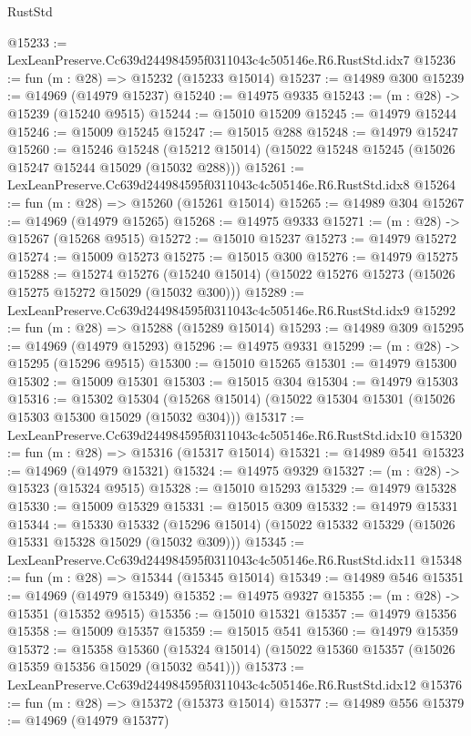 \begin{lexlean}{RustStd}
\begin{coremodule}
@15233 := LexLeanPreserve.Cc639d244984595f0311043c4c505146e.R6.RustStd.idx7
@15236 := fun (m : @28) => @15232 (@15233 @15014)
@15237 := @14989 @300
@15239 := @14969 (@14979 @15237)
@15240 := @14975 @9335
@15243 := (m : @28) -> @15239 (@15240 @9515)
@15244 := @15010 @15209
@15245 := @14979 @15244
@15246 := @15009 @15245
@15247 := @15015 @288
@15248 := @14979 @15247
@15260 := @15246
    @15248
    (@15212 @15014)
    (@15022 @15248 @15245 (@15026 @15247 @15244 @15029 (@15032 @288)))
@15261 := LexLeanPreserve.Cc639d244984595f0311043c4c505146e.R6.RustStd.idx8
@15264 := fun (m : @28) => @15260 (@15261 @15014)
@15265 := @14989 @304
@15267 := @14969 (@14979 @15265)
@15268 := @14975 @9333
@15271 := (m : @28) -> @15267 (@15268 @9515)
@15272 := @15010 @15237
@15273 := @14979 @15272
@15274 := @15009 @15273
@15275 := @15015 @300
@15276 := @14979 @15275
@15288 := @15274
    @15276
    (@15240 @15014)
    (@15022 @15276 @15273 (@15026 @15275 @15272 @15029 (@15032 @300)))
@15289 := LexLeanPreserve.Cc639d244984595f0311043c4c505146e.R6.RustStd.idx9
@15292 := fun (m : @28) => @15288 (@15289 @15014)
@15293 := @14989 @309
@15295 := @14969 (@14979 @15293)
@15296 := @14975 @9331
@15299 := (m : @28) -> @15295 (@15296 @9515)
@15300 := @15010 @15265
@15301 := @14979 @15300
@15302 := @15009 @15301
@15303 := @15015 @304
@15304 := @14979 @15303
@15316 := @15302
    @15304
    (@15268 @15014)
    (@15022 @15304 @15301 (@15026 @15303 @15300 @15029 (@15032 @304)))
@15317 := LexLeanPreserve.Cc639d244984595f0311043c4c505146e.R6.RustStd.idx10
@15320 := fun (m : @28) => @15316 (@15317 @15014)
@15321 := @14989 @541
@15323 := @14969 (@14979 @15321)
@15324 := @14975 @9329
@15327 := (m : @28) -> @15323 (@15324 @9515)
@15328 := @15010 @15293
@15329 := @14979 @15328
@15330 := @15009 @15329
@15331 := @15015 @309
@15332 := @14979 @15331
@15344 := @15330
    @15332
    (@15296 @15014)
    (@15022 @15332 @15329 (@15026 @15331 @15328 @15029 (@15032 @309)))
@15345 := LexLeanPreserve.Cc639d244984595f0311043c4c505146e.R6.RustStd.idx11
@15348 := fun (m : @28) => @15344 (@15345 @15014)
@15349 := @14989 @546
@15351 := @14969 (@14979 @15349)
@15352 := @14975 @9327
@15355 := (m : @28) -> @15351 (@15352 @9515)
@15356 := @15010 @15321
@15357 := @14979 @15356
@15358 := @15009 @15357
@15359 := @15015 @541
@15360 := @14979 @15359
@15372 := @15358
    @15360
    (@15324 @15014)
    (@15022 @15360 @15357 (@15026 @15359 @15356 @15029 (@15032 @541)))
@15373 := LexLeanPreserve.Cc639d244984595f0311043c4c505146e.R6.RustStd.idx12
@15376 := fun (m : @28) => @15372 (@15373 @15014)
@15377 := @14989 @556
@15379 := @14969 (@14979 @15377)

\end{coremodule}
\end{lexlean}
